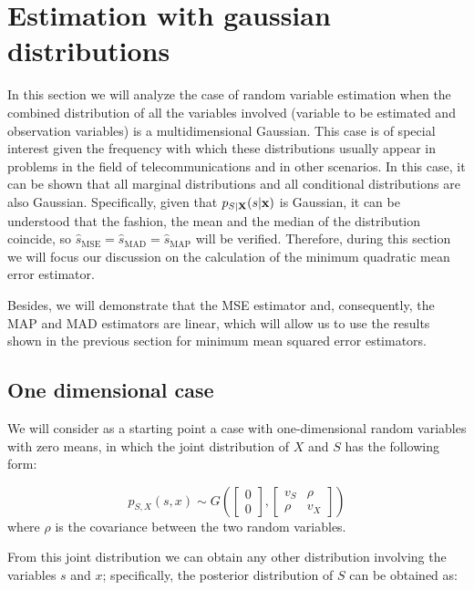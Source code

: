 \section{Estimation with gaussian distributions}

In this section we will analyze the case of random variable estimation when the combined distribution of all the variables involved (variable to be estimated and observation variables) is a multidimensional Gaussian. This case is of special interest given the frequency with which these distributions usually appear in problems in the field of telecommunications and in other scenarios. In this case, it can be shown that all marginal distributions and all conditional distributions are also Gaussian. Specifically, given that $p_{S|{\bf X}} (s|{\bf x})$ is Gaussian, it can be understood that the fashion, the mean and the median of the distribution coincide, so $\hat{s}_{\text{MSE}} = \hat{s}_{\text{MAD}} = \hat{s}_{\text{MAP}}$ will be verified. Therefore, during this section we will focus our discussion on the calculation of the minimum quadratic mean error estimator. 

Besides, we will demonstrate that the MSE estimator and, consequently, the MAP and MAD estimators are linear, which will allow us to use the results shown in the previous section for minimum mean squared error estimators.


\subsection{One dimensional case}

We will consider as a starting point a case with one-dimensional random variables with zero means, in which the joint distribution of $X$ and $S$ has the following form:

\begin{equation}
p_{S,X}(s,x) \sim G\left(\left[\begin{array}{c} 0 \\ 0 \end{array}\right],\left[\begin{array}{cc} v_S & \rho \\ \rho & v_X \end{array}\right]\right)
\end{equation}
where $\rho$ is the covariance between the two random variables.

From this joint distribution we can obtain any other distribution involving the variables $s$ and $x$; specifically, the posterior distribution of $S$ can be obtained as:

